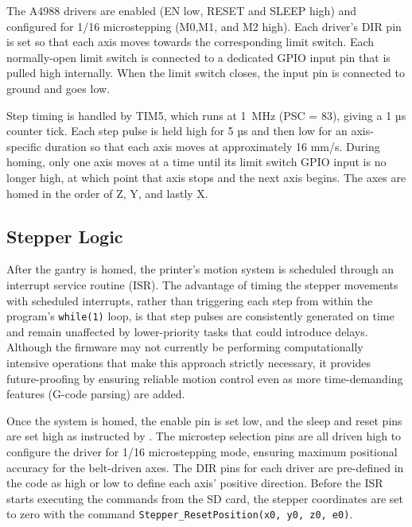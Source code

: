 The A4988 drivers are enabled (EN low, RESET and SLEEP high) and configured for 1/16 microstepping (M0,M1, and M2 high). Each driver's DIR pin is set so that each axis moves towards the corresponding limit switch. Each normally-open limit switch is connected to a dedicated GPIO input pin that is pulled high internally. When the limit switch closes, the input pin is connected to ground and goes low.

Step timing is handled by TIM5, which runs at 1~MHz (PSC = 83), giving a 1 µs counter tick. Each step pulse is held high for 5 µs and then low for an axis-specific duration so that each axis moves at approximately 16 mm/s. During homing, only one axis moves at a time until its limit switch GPIO input is no longer high, at which point that axis stops and the next axis begins. The axes are homed in the order of Z, Y, and lastly X.

\subsection{Stepper Logic}
After the gantry is homed, the printer's motion system is scheduled through an interrupt service routine (ISR). The advantage of timing the stepper movements with scheduled interrupts, rather than triggering each step from within the program’s \texttt{while(1)} loop, is that step pulses are consistently generated on time and remain unaffected by lower-priority tasks that could introduce delays. Although the firmware may not currently be performing computationally intensive operations that make this approach strictly necessary, it provides future-proofing by ensuring reliable motion control even as more time-demanding features (G-code parsing) are added.

Once the system is homed, the enable pin is set low, and the sleep and reset pins are set high as instructed by \cite{Allegro_A4988}. The microstep selection pins are all driven high to configure the driver for 1/16 microstepping mode, ensuring maximum positional accuracy for the belt-driven axes. The DIR pins for each driver are pre-defined in the code as high or low to define each axis' positive direction. Before the ISR starts executing the commands from the SD card, the stepper coordinates are set to zero with the command \texttt{Stepper\_ResetPosition(x0, y0, z0, e0)}.

